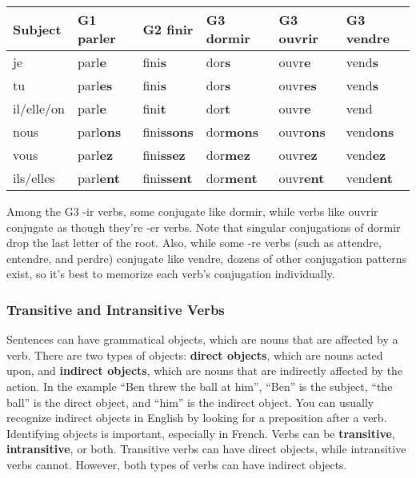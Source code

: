 \begin{center}\begin{tabular}{|l|l|l|l|l|l|}
\hline
\textbf{Subject} & \textbf{G1 parler} & \textbf{G2 finir} & \textbf{G3 dormir} & \textbf{G3 ouvrir} & \textbf{G3 vendre} \\ \hline
je               & parl\textbf{e}              & fini\textbf{s}             & dor\textbf{s}               & ouvr\textbf{e}              & vend\textbf{s}              \\ \hline
tu               & parl\textbf{es}             & fini\textbf{s}             & dor\textbf{s}               & ouvr\textbf{es}             & vend\textbf{s}              \\ \hline
il/elle/on       & parl\textbf{e}              & fini\textbf{t}             & dor\textbf{t}               & ouvr\textbf{e}              & vend               \\ \hline
nous             & parl\textbf{ons}            & fini\textbf{ssons}         & dor\textbf{mons}            & ouvr\textbf{ons}            & vend\textbf{ons}            \\ \hline
vous             & parl\textbf{ez}             & fini\textbf{ssez}          & dor\textbf{mez}             & ouvr\textbf{ez}             & vend\textbf{ez}             \\ \hline
ils/elles        & parl\textbf{ent}            & fini\textbf{ssent}         & dor\textbf{ment}            & ouvr\textbf{ent}            & vend\textbf{ent         }   \\ \hline
\end{tabular}\end{center}

Among the G3 -ir verbs, some conjugate like dormir, while verbs like ouvrir conjugate as though they're -er verbs. Note that singular conjugations of dormir drop the last letter of the root. Also, while some -re verbs (such as attendre, entendre, and perdre) conjugate like vendre, dozens of other conjugation patterns exist, so it's best to memorize each verb's conjugation individually.

\subsubsection{Transitive and Intransitive Verbs}

Sentences can have grammatical objects, which are nouns that are affected by a verb. There are two types of objects: \textbf{direct objects}, which are nouns acted upon, and \textbf{indirect objects}, which are nouns that are indirectly affected by the action.  In the example ``Ben threw the ball at him'', ``Ben'' is the subject, ``the ball'' is the direct object, and ``him'' is the indirect object. You can usually recognize indirect objects in English by looking for a preposition after a verb. Identifying objects is important, especially in French.  Verbs can be \textbf{transitive}, \textbf{intransitive}, or both. Transitive verbs can have direct objects, while intransitive verbs cannot. However, both types of verbs can have indirect objects.

